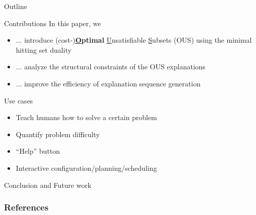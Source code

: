 \documentclass{beamer}
\begin{document}
\begin{frame}{Outline}

\end{frame}

\begin{frame}{Contributions}
    \vfill
    In this paper, we 
    \vfill
    \begin{itemize}
        \item ... introduce (cost-)\textbf{\underline{O}ptimal} \underline{U}nsatisfiable \underline{S}ubsets (OUS) using the minimal hitting set duality
        \item ... analyze the structural constraints of the OUS explanations
        \item ... improve the efficiency of explanation sequence generation
    \end{itemize}
    \vfill
\end{frame}

\begin{frame}{Use cases}
    \begin{itemize}
        \item Teach humans how to solve a certain problem
        \item Quantify problem difficulty
        \item ``Help'' button
        \item Interactive configuration/planning/scheduling
    \end{itemize}
\end{frame}

\begin{frame}{Conclusion and Future work}

\end{frame}

\begin{frame}[allowframebreaks]
	\frametitle{References}
	
	
\end{frame}
\end{document}
